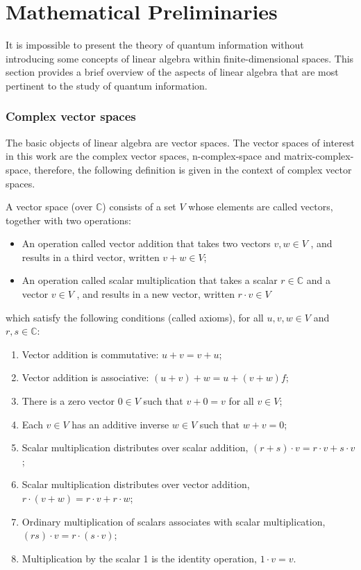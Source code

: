 \section{Mathematical Preliminaries} \label{sec:Math}


It is impossible to present the theory of quantum information without introducing some concepts of linear algebra within finite-dimensional spaces. This section provides a brief overview of the aspects of linear algebra that are most pertinent to the study of quantum information. 

\subsubsection{Complex vector spaces}

The basic objects of linear algebra are vector spaces. The vector spaces of interest in this work are the complex vector spaces, \gls{n-complex-space} and \gls{matrix-complex-space}, therefore, the following definition is given in the context of complex vector spaces. 

\begin{definition}
A vector space (over $\mathbb{C}$)  consists of a set $V$ whose elements are called vectors, together with two operations:
\begin{itemize}
  \item An operation called vector addition that takes two vectors $v, w \in V$ , and results in a third vector, written $v + w \in V$;
  \item An operation called scalar multiplication that takes a scalar $r \in \mathbb{C}$ and a vector $v \in V$ , and results in a new vector, written $r \cdot v \in V$
\end{itemize}
which satisfy the following conditions (called axioms), for all $u, v, w \in V$ and $r, s \in \mathbb{C}$:

\begin{enumerate}
  \item Vector addition is commutative: $u + v = v + u$;
  \item Vector addition is associative: $(u + v) + w = u + (v + w) f$;
  \item There is a zero vector $0 \in V$ such that $v +0 = v$ for all $v \in V$;
  \item Each $v \in V$ has an additive inverse $w \in V$ such that $w + v = 0$;
  \item Scalar multiplication distributes over scalar addition, $(r+s) \cdot v = r \cdot v +s \cdot v$;
  \item Scalar multiplication distributes over vector addition, $r \cdot (v + w) = r \cdot v + r \cdot w$;
  \item Ordinary multiplication of scalars associates with scalar multiplication, $(rs) \cdot v = r \cdot (s \cdot v)$;
  \item Multiplication by the scalar 1 is the identity operation, $1 \cdot v = v$.
\end{enumerate}

\end{definition}

